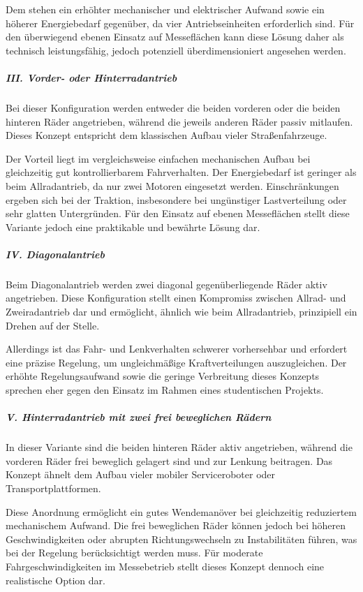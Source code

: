 Dem stehen ein erhöhter mechanischer und elektrischer Aufwand sowie ein höherer Energiebedarf gegenüber, da vier Antriebseinheiten erforderlich sind. Für den überwiegend ebenen Einsatz auf Messeflächen kann diese Lösung daher als technisch leistungsfähig, jedoch potenziell überdimensioniert angesehen werden.

\subparagraph{III. Vorder- oder Hinterradantrieb}
Bei dieser Konfiguration werden entweder die beiden vorderen oder die beiden hinteren Räder angetrieben, während die jeweils anderen Räder passiv mitlaufen. Dieses Konzept entspricht dem klassischen Aufbau vieler Straßenfahrzeuge. \cite{wong2001theory}

Der Vorteil liegt im vergleichsweise einfachen mechanischen Aufbau bei gleichzeitig gut kontrollierbarem Fahrverhalten. Der Energiebedarf ist geringer als beim Allradantrieb, da nur zwei Motoren eingesetzt werden. Einschränkungen ergeben sich bei der Traktion, insbesondere bei ungünstiger Lastverteilung oder sehr glatten Untergründen. Für den Einsatz auf ebenen Messeflächen stellt diese Variante jedoch eine praktikable und bewährte Lösung dar.

\subparagraph{IV. Diagonalantrieb}
Beim Diagonalantrieb werden zwei diagonal gegenüberliegende Räder aktiv angetrieben. Diese Konfiguration stellt einen Kompromiss zwischen Allrad- und Zweiradantrieb dar und ermöglicht, ähnlich wie beim Allradantrieb, prinzipiell ein Drehen auf der Stelle.

Allerdings ist das Fahr- und Lenkverhalten schwerer vorhersehbar und erfordert eine präzise Regelung, um ungleichmäßige Kraftverteilungen auszugleichen. Der erhöhte Regelungsaufwand sowie die geringe Verbreitung dieses Konzepts sprechen eher gegen den Einsatz im Rahmen eines studentischen Projekts.

\subparagraph{V. Hinterradantrieb mit zwei frei beweglichen Rädern}
In dieser Variante sind die beiden hinteren Räder aktiv angetrieben, während die vorderen Räder frei beweglich gelagert sind und zur Lenkung beitragen. Das Konzept ähnelt dem Aufbau vieler mobiler Serviceroboter oder Transportplattformen.

Diese Anordnung ermöglicht ein gutes Wendemanöver bei gleichzeitig reduziertem mechanischem Aufwand. Die frei beweglichen Räder können jedoch bei höheren Geschwindigkeiten oder abrupten Richtungswechseln zu Instabilitäten führen, was bei der Regelung berücksichtigt werden muss. Für moderate Fahrgeschwindigkeiten im Messebetrieb stellt dieses Konzept dennoch eine realistische Option dar.

